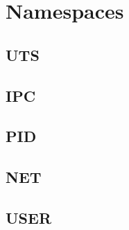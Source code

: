 
\section{Namespaces}

\subsection{UTS}

\subsection{IPC}

\subsection{PID}

\subsection{NET}

\subsection{USER}
